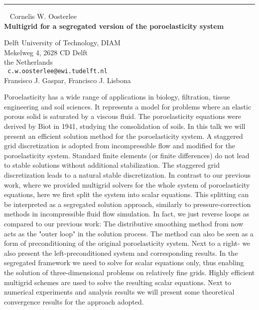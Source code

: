 \documentclass{report}
\begin{document}
\begin{center}

\rule{6in}{1pt} \
{\large
Cornelis W. Oosterlee 
\\ {\bf
Multigrid for a segregated version of the poroelasticity system
}}

Delft University of Technology, DIAM \\
Mekelweg 4, 2628 CD Delft \\
the Netherlands
\\ {\tt
c.w.oosterlee@ewi.tudelft.nl
}
\\
Fransisco J. Gaspar,  Francisco J. Lisbona
\end{center}

Poroelasticity has a wide range of applications in biology, filtration,
tissue engineering and soil sciences. It represents a model for
problems where an elastic porous solid is saturated by a viscous fluid.
The poroelasticity equations were derived by Biot in 1941, studying the
consolidation of soils. In this talk we will present an efficient
solution method for the poroelasticity system. A staggered grid
discretization is adopted from incompressible flow and modified for the
poroelasticity system. Standard finite elements (or finite differences)
do not lead to stable solutions without additional stabilization. The
staggered grid discretization leads to a natural stable discretization.
In contrast to our previous work, where we provided multigrid
solvers for the whole system of poroelasticity equations, here we first
split the system into scalar equations. This splitting can be
interpreted as a segregated solution approach, similarly to
pressure-correction methods in incompressible fluid flow simulation. In
fact, we just reverse loops as compared to our previous work: The
distributive smoothing method from now acts as the "outer loop" in
the solution process. The method can also be seen as a form of
preconditioning of the original poroelasticity system. Next to a right-
we also present the left-preconditioned system and corresponding
results. In the segregated framework we need to solve for scalar
equations only, thus enabling the solution of three-dimensional
problems on relatively fine grids. Highly efficient multigrid schemes
are used to solve the resulting scalar equations. Next to numerical
experiments and analysis results we will present some theoretical
convergence results for the approach adopted. 
\end{document}
